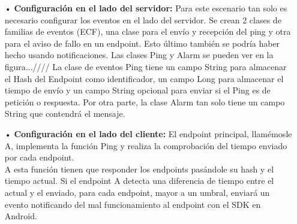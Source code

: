 \documentclass[12pt, twoside]{book}
\begin{document}
\begin{itemize}
\item[•] \textbf{Configuración en el lado del servidor: } Para este escenario tan solo es necesario configurar los eventos en el lado del servidor.  Se crean 2 clases de familias de eventos (ECF), una clase para el envío y recepción del ping y otra para el aviso de fallo en un endpoint. Esto último también se podría haber hecho usando notificaciones. Las clases Ping y Alarm se pueden ver en la figura...//// La clase de eventos Ping tiene un campo String para almacenar el Hash del Endpoint como identificador, un campo Long para almacenar el tiempo de envío y un campo String opcional para enviar si el Ping es de petición o respuesta. Por otra parte, la clase Alarm tan solo tiene un campo String que contendrá el mensaje.
\item[•] \textbf{Configuración en el lado del cliente: } El endpoint principal, llamémosle A, implementa la función Ping y realiza la comprobación del tiempo enviado por cada endpoint. \\
A esta función tienen que responder los endpoints pasándole su hash y el tiempo actual. 
Si el endpoint A detecta una diferencia de tiempo entre el actual y el enviado, para cada endpoint, mayor a un umbral, enviará un evento notificando del mal funcionamiento al endpoint con el SDK en Android.


\end{itemize}
\end{document}
